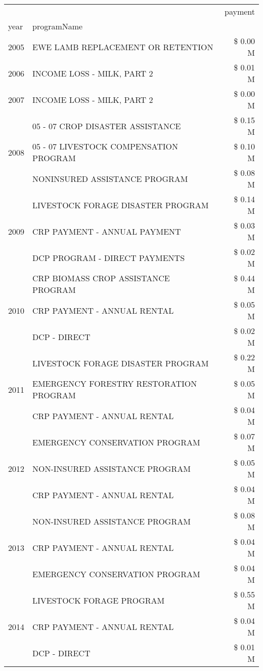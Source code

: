 \begin{tabular}{llr}
\toprule
 &  & payment \\
year & programName &  \\
\midrule
2005 & EWE LAMB REPLACEMENT OR RETENTION & \$ 0.00 M \\
\cline{1-3}
2006 & INCOME LOSS - MILK, PART 2 & \$ 0.01 M \\
\cline{1-3}
2007 & INCOME LOSS - MILK, PART 2 & \$ 0.00 M \\
\cline{1-3}
\multirow[t]{3}{*}{2008} & 05 - 07 CROP DISASTER ASSISTANCE & \$ 0.15 M \\
 & 05 - 07 LIVESTOCK COMPENSATION PROGRAM & \$ 0.10 M \\
 & NONINSURED ASSISTANCE PROGRAM & \$ 0.08 M \\
\cline{1-3}
\multirow[t]{3}{*}{2009} & LIVESTOCK FORAGE DISASTER  PROGRAM & \$ 0.14 M \\
 & CRP PAYMENT - ANNUAL PAYMENT & \$ 0.03 M \\
 & DCP PROGRAM - DIRECT PAYMENTS & \$ 0.02 M \\
\cline{1-3}
\multirow[t]{3}{*}{2010} & CRP BIOMASS CROP ASSISTANCE PROGRAM & \$ 0.44 M \\
 & CRP PAYMENT - ANNUAL RENTAL & \$ 0.05 M \\
 & DCP - DIRECT & \$ 0.02 M \\
\cline{1-3}
\multirow[t]{3}{*}{2011} & LIVESTOCK FORAGE DISASTER PROGRAM & \$ 0.22 M \\
 & EMERGENCY FORESTRY RESTORATION PROGRAM & \$ 0.05 M \\
 & CRP PAYMENT - ANNUAL RENTAL & \$ 0.04 M \\
\cline{1-3}
\multirow[t]{3}{*}{2012} & EMERGENCY CONSERVATION PROGRAM & \$ 0.07 M \\
 & NON-INSURED ASSISTANCE PROGRAM & \$ 0.05 M \\
 & CRP PAYMENT - ANNUAL RENTAL & \$ 0.04 M \\
\cline{1-3}
\multirow[t]{3}{*}{2013} & NON-INSURED ASSISTANCE PROGRAM & \$ 0.08 M \\
 & CRP PAYMENT - ANNUAL RENTAL & \$ 0.04 M \\
 & EMERGENCY CONSERVATION PROGRAM & \$ 0.04 M \\
\cline{1-3}
\multirow[t]{3}{*}{2014} & LIVESTOCK FORAGE PROGRAM & \$ 0.55 M \\
 & CRP PAYMENT - ANNUAL RENTAL & \$ 0.04 M \\
 & DCP - DIRECT & \$ 0.01 M \\
\cline{1-3}

\end{tabular}
